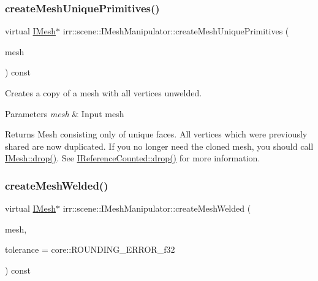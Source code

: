 \subsubsection{\texorpdfstring{create\+Mesh\+Unique\+Primitives()}{createMeshUniquePrimitives()}}
{\footnotesize\ttfamily virtual \hyperlink{classirr_1_1scene_1_1IMesh}{I\+Mesh}$\ast$ irr\+::scene\+::\+I\+Mesh\+Manipulator\+::create\+Mesh\+Unique\+Primitives (\begin{DoxyParamCaption}\item[{\hyperlink{classirr_1_1scene_1_1IMesh}{I\+Mesh} $\ast$}]{mesh }\end{DoxyParamCaption}) const\hspace{0.3cm}{\ttfamily [pure virtual]}}



Creates a copy of a mesh with all vertices unwelded. 


\begin{DoxyParams}{Parameters}
{\em mesh} & Input mesh \\
\hline
\end{DoxyParams}
\begin{DoxyReturn}{Returns}
Mesh consisting only of unique faces. All vertices which were previously shared are now duplicated. If you no longer need the cloned mesh, you should call \hyperlink{classirr_1_1IReferenceCounted_a03856a09355b89d178090c4a5f738543}{I\+Mesh\+::drop()}. See \hyperlink{classirr_1_1IReferenceCounted_a03856a09355b89d178090c4a5f738543}{I\+Reference\+Counted\+::drop()} for more information. 
\end{DoxyReturn}
\mbox{\label{classirr_1_1scene_1_1IMeshManipulator_ac19065037302c0500cb6ebecefcc6c6d}} 
\subsubsection{\texorpdfstring{create\+Mesh\+Welded()}{createMeshWelded()}}
{\footnotesize\ttfamily virtual \hyperlink{classirr_1_1scene_1_1IMesh}{I\+Mesh}$\ast$ irr\+::scene\+::\+I\+Mesh\+Manipulator\+::create\+Mesh\+Welded (\begin{DoxyParamCaption}\item[{\hyperlink{classirr_1_1scene_1_1IMesh}{I\+Mesh} $\ast$}]{mesh,  }\item[{\hyperlink{namespaceirr_a0277be98d67dc26ff93b1a6a1d086b07}{f32}}]{tolerance = {\ttfamily core\+:\+:ROUNDING\+\_\+ERROR\+\_\+f32} }\end{DoxyParamCaption}) const\hspace{0.3cm}{\ttfamily [pure virtual]}}



